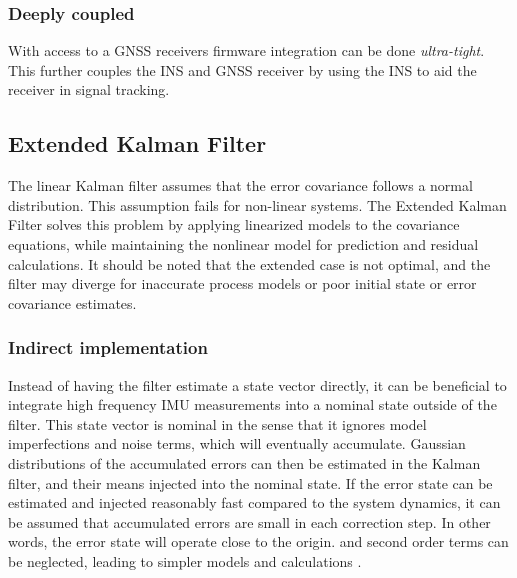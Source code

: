     \subsubsection{Deeply coupled}
    With access to a GNSS receivers firmware integration can be done \textit{ultra-tight}. This further couples the INS and GNSS receiver by using the INS to aid the receiver in signal tracking.
    
    
\subsection{Extended Kalman Filter}
    
The linear Kalman filter assumes that the error covariance follows a normal distribution. This assumption fails for non-linear systems. The Extended Kalman Filter solves this problem by applying linearized models to the covariance equations, while maintaining the nonlinear model for prediction and residual calculations. It should be noted that the extended case is not optimal, and the filter may diverge for inaccurate process models or poor initial state or error covariance estimates.  %


    \subsubsection{Indirect implementation}
    Instead of having the filter estimate a state vector directly, it can be beneficial to integrate high frequency IMU measurements into a nominal state outside of the filter. This state vector is nominal in the sense that it ignores model imperfections and noise terms, which will eventually accumulate. Gaussian distributions of the accumulated errors can then be estimated in the Kalman filter, and their means injected into the nominal state. If the error state can be estimated and injected reasonably fast compared to the system dynamics, it can be assumed that accumulated errors are small in each correction step. In other words, the error state will operate close to the origin. and second order terms can be neglected, leading to simpler models and calculations \cite{sola2017quaternion}.\\
        
